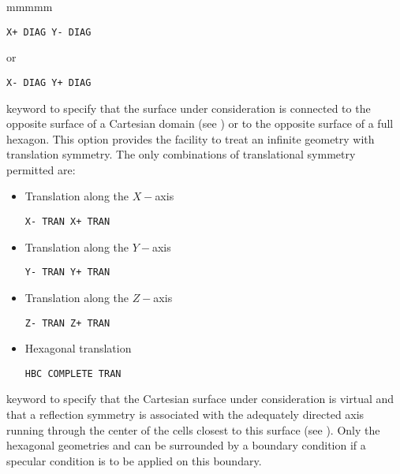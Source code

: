 \begin{ListeDeDescription}{mmmmm}
\begin{verbatim}
X+ DIAG Y- DIAG 
\end{verbatim}

\noindent
or

\begin{verbatim}
X- DIAG Y+ DIAG 
\end{verbatim}

\item[\moc{TRAN}] keyword to specify that the surface under consideration is
connected to the opposite surface of a Cartesian domain (see ) or to
the opposite surface of a full hexagon. This option  provides
the facility to treat an infinite geometry with translation symmetry. The only
combinations of translational symmetry permitted are:

\begin{itemize}
\item Translation along the $X-$axis

\begin{verbatim}
X- TRAN X+ TRAN 
\end{verbatim}

\item Translation along the $Y-$axis

\begin{verbatim}
Y- TRAN Y+ TRAN 
\end{verbatim}

\item Translation along the $Z-$axis

\begin{verbatim}
Z- TRAN Z+ TRAN 
\end{verbatim}

\item Hexagonal translation

\begin{verbatim}
HBC COMPLETE TRAN
\end{verbatim}

\end{itemize}

\item[\moc{SYME}] keyword to specify that the Cartesian surface under
consideration is virtual and that a reflection symmetry is associated with the
adequately directed axis running through the center of the cells closest to this
surface (see ). Only the hexagonal geometries  and  can be
surrounded by a  boundary condition if a specular condition
is to be applied on this boundary.


\end{ListeDeDescription}
